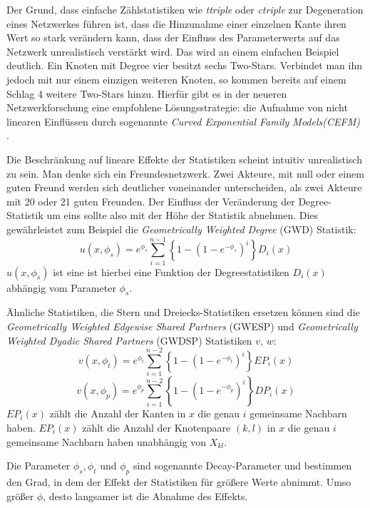 \documentclass[a4paper,ngerman,oneside,titlepage,bibliography=totoc,11pt]{scrreprt}
\begin{document}
Der Grund, dass einfache Zählstatistiken wie \textit{ttriple} oder \textit{ctriple} zur Degeneration eines Netzwerkes führen ist, dass die Hinzunahme einer einzelnen Kante ihren Wert so stark verändern kann, dass der Einfluss des Parameterwerts auf das Netzwerk unrealistisch verstärkt wird. Das wird an einem einfachen Beispiel deutlich. Ein Knoten mit Degree vier besitzt sechs Two-Stars. Verbindet man ihn jedoch mit nur einem einzigen weiteren Knoten, so kommen bereits auf einem Schlag 4 weitere Two-Stars hinzu. Hierfür gibt es in der neueren Netzwerkforschung eine empfohlene Lösungsstrategie: die Aufnahme von nicht linearen Einflüssen durch sogenannte \emph{Curved Exponential Family Models(CEFM)} \citep{hunter2007curved}.

Die Beschränkung auf lineare Effekte der Statistiken scheint intuitiv unrealistisch zu sein. Man denke sich ein Freundesnetzwerk. Zwei Akteure, mit null oder einem guten Freund werden sich deutlicher voneinander unterscheiden, als zwei Akteure mit 20 oder 21 guten Freunden. Der Einfluss der Veränderung der Degree-Statistik um eins sollte also mit der Höhe der Statistik abnehmen. Dies gewährleistet zum Beispiel die \textit{Geometrically Weighted Degree} (GWD) Statistik:
\begin{equation}
	u(x, \phi_s) = e^{\phi_s} \sum^{n-1}_{i=1}\left\{1-(1-e^{-\phi_s})^{i}\right\}D_i(x)
	\label{eq:GWD}
\end{equation}
$u(x,\phi_s)$ ist eine ist hierbei eine Funktion der Degreestatistiken $D_i(x)$ abhängig vom Parameter $\phi_s$.

Ähnliche Statistiken, die Stern und Dreiecks-Statistiken ersetzen können sind die \textit{Geometrically Weighted Edgewise Shared Partners} (GWESP) und \textit{Geometrically Weighted Dyadic Shared Partners} (GWDSP) Statistiken $v$, $w$:
\begin{equation}
	v(x, \phi_t) = e^{\phi_t} \sum^{n-2}_{i=1}\left\{1-(1-e^{-\phi_t})^{i}\right\}EP_i(x)
	\label{eq:GWESP}
\end{equation}
\begin{equation}
	v(x, \phi_p) = e^{\phi_p} \sum^{n-2}_{i=1}\left\{1-(1-e^{-\phi_p})^{i}\right\}DP_i(x)
	\label{eq:GWDSP}
\end{equation}
$EP_i(x)$ zählt die Anzahl der Kanten in $x$ die genau $i$ gemeinsame Nachbarn haben. $EP_i(x)$ zählt die Anzahl der Knotenpaare $(k,l)$ in $x$ die genau $i$ gemeinsame Nachbarn haben unabhängig von $X_{kl}$.

Die Parameter $\phi_s, \phi_t$ und $\phi_p$ sind sogenannte Decay-Parameter und bestimmen den Grad, in dem der Effekt der Statistiken für größere Werte abnimmt. Umso größer $\phi$, desto langsamer ist die Abnahme des Effekts.
\end{document}
